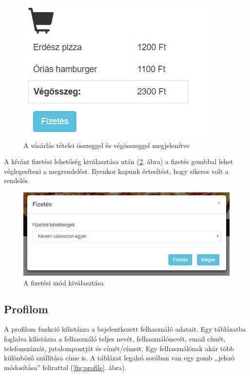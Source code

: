 \begin{figure}
\centering
\includegraphics[scale=0.8]{kepek/order.png}
\caption{A vásárlás tételei összeggel és végösszeggel megjelenítve}
\label{fig:order}
\end{figure}

A kívánt fizetési lehetőség kiválasztása után (\ref{fig:payment}. ábra) a fizetés gombbal lehet véglegesíteni a megrendelést. Ilyenkor kapunk értesítést, hogy sikeres volt a rendelés.

\begin{figure}
\centering
\includegraphics[scale=0.8]{kepek/payment.png}
\caption{A fizetési mód kiválasztása}
\label{fig:payment}
\end{figure}

\subsection{Profilom}

A profilom funkció kilistázza a bejelentkezett felhasználó adatait. Egy táblázatba foglalva kilistázza a felhasználó teljes nevét, felhasználónevét, email címét, telefonszámát, jutalompontját és címét/címeit. Egy felhasználónak akár több különböző szállítása címe is. A táblázat legalsó sorában van egy gomb „jelszó módosítása” felirattal (\ref{fig:profile}. ábra).

